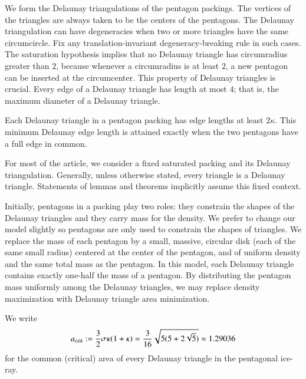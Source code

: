 We form the Delaunay triangulations of the pentagon packings.  The
vertices of the triangles are always taken to be the centers of the
pentagons.  The Delaunay triangulation can have degeneracies when two
or more triangles have the same circumcircle.  Fix any
translation-invariant degeneracy-breaking rule in such cases.  The
saturation hypothesis implies that no Delaunay triangle has
circumradius greater than $2$, because whenever a circumradius is at
least $2$, a new pentagon can be inserted at the circumcenter.  This
property of Delaunay triangles is crucial.  Every edge of a Delaunay
triangle has length at most $4$; that is, the maximum diameter of a
Delaunay triangle.

Each Delaunay triangle in a pentagon packing has edge lengths at least
$2\kappa$.  This minimum Delaunay edge length is attained exactly when
the two pentagons have a full edge in common.

For most of the article, we consider a fixed saturated packing and its
Delaunay triangulation.  Generally, unless otherwise stated,
every triangle is a  Delaunay triangle.
Statements of lemmas and theorems implicitly
assume this fixed context.

Initially, pentagons in a packing play two roles: they constrain the
shapes of the Delaunay triangles and they carry mass for the density.
We prefer to change our model slightly so pentagons are only used
to constrain the shapes of triangles.  We replace the mass of each
pentagon by a small, massive, circular disk (each of the same small
radius) centered at the center of the pentagon, and of uniform density
and the same total mass as the pentagon.  In this model, each Delaunay
triangle contains exactly one-half the mass of a pentagon.  By
distributing the pentagon mass uniformly among the Delaunay triangles,
we may replace density maximization with Delaunay triangle area
minimization.

We write 
\[
a_\text{crit} := \frac{3}{2}{ \sigma \kappa(1+\kappa)} =
\frac{3}{16}\sqrt{5(5+2\sqrt5)}\approx 1.29036
\] %
for the common (critical) area of every Delaunay triangle in the 
pentagonal ice-ray.

